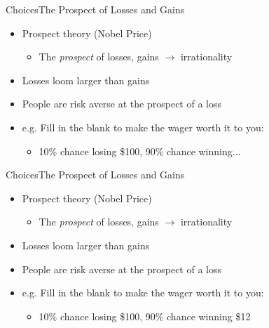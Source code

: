 \documentclass{beamer}
\begin{document}
\begin{frame}{Choices}{The Prospect of Losses and Gains}
  \begin{itemize}
  \addtolength{\itemsep}{0.5\baselineskip}
  \item Prospect theory (Nobel Price) 
        \begin{itemize}
        \item The {\it prospect} of losses, gains $\rightarrow$ irrationality
        \end{itemize}
  \item Losses loom larger than gains
  \item People are risk averse at the prospect of a loss
  \item e.g. Fill in the blank to make the wager worth it to you:
        \begin{itemize}
        \item 10\% chance losing \$100, 90\% chance winning...
        \end{itemize}
  \end{itemize}
\end{frame}

\begin{frame}{Choices}{The Prospect of Losses and Gains}
  \begin{itemize}
  \addtolength{\itemsep}{0.5\baselineskip}
  \item Prospect theory (Nobel Price) 
        \begin{itemize}
        \item The {\it prospect} of losses, gains $\rightarrow$ irrationality
        \end{itemize}
  \item Losses loom larger than gains
  \item People are risk averse at the prospect of a loss
  \item e.g. Fill in the blank to make the wager worth it to you:
        \begin{itemize}
        \item 10\% chance losing \$100, 90\% chance winning \$12
        \end{itemize}
  \end{itemize}

\end{frame}
\end{document}
